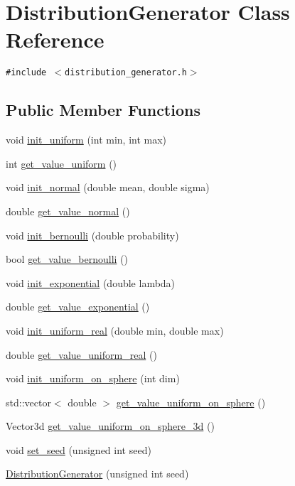 \hypertarget{class_distribution_generator}{
\section{DistributionGenerator Class Reference}
\label{class_distribution_generator}
}
{\tt \#include $<$distribution\_\-generator.h$>$}

\subsection*{Public Member Functions}
\begin{CompactItemize}
\item 
void \hyperlink{class_distribution_generator_fd5fdeedbf8015f742a1d9a4557ce50e}{init\_\-uniform} (int min, int max)
\item 
int \hyperlink{class_distribution_generator_60f7610a91c00ff1919613088c7aff59}{get\_\-value\_\-uniform} ()
\item 
void \hyperlink{class_distribution_generator_91bfbf1fa31540fdccb5fccb98abbf9a}{init\_\-normal} (double mean, double sigma)
\item 
double \hyperlink{class_distribution_generator_cee20f8384e79b351040f9d864750569}{get\_\-value\_\-normal} ()
\item 
void \hyperlink{class_distribution_generator_00f450f4a649e3a5c53d9cdebf160e67}{init\_\-bernoulli} (double probability)
\item 
bool \hyperlink{class_distribution_generator_f9be2ca79fea37085900802673d9c16a}{get\_\-value\_\-bernoulli} ()
\item 
void \hyperlink{class_distribution_generator_5204a1fa18cf090b2fe3891d4d3f7a07}{init\_\-exponential} (double lambda)
\item 
double \hyperlink{class_distribution_generator_217a1822a0f49680cbc8a32bb75ba687}{get\_\-value\_\-exponential} ()
\item 
void \hyperlink{class_distribution_generator_2b293a6d907be3c3d182a1d8dc234fdf}{init\_\-uniform\_\-real} (double min, double max)
\item 
double \hyperlink{class_distribution_generator_0d7089a0e10b8fad8a70b2e1c8b23ba6}{get\_\-value\_\-uniform\_\-real} ()
\item 
void \hyperlink{class_distribution_generator_66a05089faa08bf8939496f87c2672ef}{init\_\-uniform\_\-on\_\-sphere} (int dim)
\item 
std::vector$<$ double $>$ \hyperlink{class_distribution_generator_e11f8754b4a01555fcf929ac58179021}{get\_\-value\_\-uniform\_\-on\_\-sphere} ()
\item 
Vector3d \hyperlink{class_distribution_generator_8162739d29e15e6a7ffacd2e66954ae6}{get\_\-value\_\-uniform\_\-on\_\-sphere\_\-3d} ()
\item 
void \hyperlink{class_distribution_generator_0d1d61ff597511560c3e48a5ee7ccee9}{set\_\-seed} (unsigned int seed)
\item 
\hyperlink{class_distribution_generator_2472817069deda51980e39d36d635991}{DistributionGenerator} (unsigned int seed)
\end{CompactItemize}
